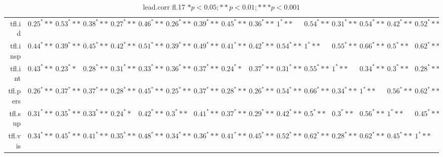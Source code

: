 \begin{table}[ht]
\begin{tabular}{rlllllllllllllll}
  tfl.id & $0.25^***$ & $0.53^***$ & $0.38^***$ & $0.27^***$ & $0.46^***$ & $0.26^***$ & $0.39^***$ & $0.45^***$ & $0.36^***$ & $1^***$ & $0.54^***$ & $0.31^***$ & $0.54^***$ & $0.42^***$ & $0.52^***$ \\ 
  tfl.insp & $0.44^***$ & $0.39^***$ & $0.45^***$ & $0.42^***$ & $0.51^***$ & $0.39^***$ & $0.49^***$ & $0.41^***$ & $0.42^***$ & $0.54^***$ & $1^***$ & $0.55^***$ & $0.66^***$ & $0.5^***$ & $0.62^***$ \\ 
  tfl.int & $0.43^***$ & $0.23^**$ & $0.28^***$ & $0.31^***$ & $0.33^***$ & $0.36^***$ & $0.37^***$ & $0.24^**$ & $0.37^***$ & $0.31^***$ & $0.55^***$ & $1^***$ & $0.34^***$ & $0.3^***$ & $0.28^***$ \\ 
  tfl.pers & $0.26^***$ & $0.37^***$ & $0.37^***$ & $0.28^***$ & $0.45^***$ & $0.25^***$ & $0.37^***$ & $0.28^***$ & $0.26^***$ & $0.54^***$ & $0.66^***$ & $0.34^***$ & $1^***$ & $0.56^***$ & $0.62^***$ \\ 
  tfl.sup & $0.31^***$ & $0.35^***$ & $0.33^***$ & $0.24^**$ & $0.42^***$ & $0.3^***$ & $0.41^***$ & $0.37^***$ & $0.29^***$ & $0.42^***$ & $0.5^***$ & $0.3^***$ & $0.56^***$ & $1^***$ & $0.45^***$ \\ 
  tfl.vis & $0.34^***$ & $0.45^***$ & $0.41^***$ & $0.35^***$ & $0.48^***$ & $0.34^***$ & $0.36^***$ & $0.41^***$ & $0.45^***$ & $0.52^***$ & $0.62^***$ & $0.28^***$ & $0.62^***$ & $0.45^***$ & $1^***$ \\ 
   \hline
\end{tabular}
\caption{lead.corr fl.17 $* p < 0.05; ** p < 0.01; *** p < 0.001$} 
\end{table}

